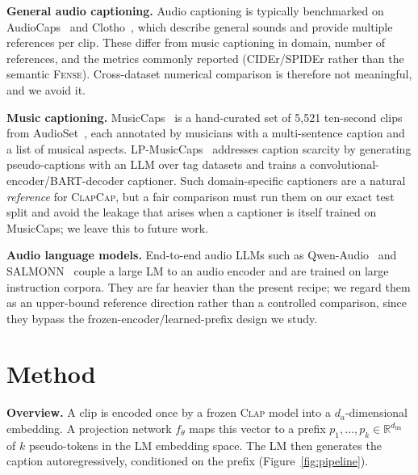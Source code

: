 \documentclass{article}
\newcommand{\fense}{\textsc{Fense}}
\newcommand{\clapenc}{\textsc{Clap}}
\newcommand{\sys}{\textsc{ClapCap}}
\begin{document}
\textbf{General audio captioning.}
Audio captioning is typically benchmarked on AudioCaps~\cite{kim2019audiocaps} and
Clotho~\cite{drossos2020clotho}, which describe general sounds and provide multiple references
per clip. These differ from music captioning in domain, number of references, and the metrics
commonly reported (CIDEr/SPIDEr rather than the semantic \fense{}). Cross-dataset numerical
comparison is therefore not meaningful, and we avoid it.

\textbf{Music captioning.}
MusicCaps~\cite{agostinelli2023musiclm} is a hand-curated set of 5{,}521 ten-second clips from
AudioSet~\cite{gemmeke2017audioset}, each annotated by musicians with a multi-sentence caption and a list of musical
aspects. LP-MusicCaps~\cite{doh2023lpmusiccaps} addresses caption scarcity by generating
pseudo-captions with an LLM over tag datasets and trains a convolutional-encoder/BART-decoder
captioner. Such domain-specific captioners are a natural \emph{reference} for \sys{}, but a fair
comparison must run them on our exact test split and avoid the leakage that arises when a
captioner is itself trained on MusicCaps; we leave this to future work.

\textbf{Audio language models.}
End-to-end audio LLMs such as Qwen-Audio~\cite{chu2023qwenaudio} and
SALMONN~\cite{tang2024salmonn} couple a large LM to an audio encoder and are trained on large
instruction corpora. They are far heavier than the present recipe; we regard them as an
upper-bound reference direction rather than a controlled comparison, since they bypass the
frozen-encoder/learned-prefix design we study.

\section{Method}\label{sec:method}

\textbf{Overview.}
A clip is encoded once by a frozen \clapenc{} model into a $d_a$-dimensional embedding. A
projection network $f_\theta$ maps this vector to a prefix
$p_1,\dots,p_k \in \mathbb{R}^{d_{\text{lm}}}$ of $k$ pseudo-tokens in the LM embedding space.
The LM then generates the caption autoregressively, conditioned on the prefix
(Figure~\ref{fig:pipeline}).
\end{document}

